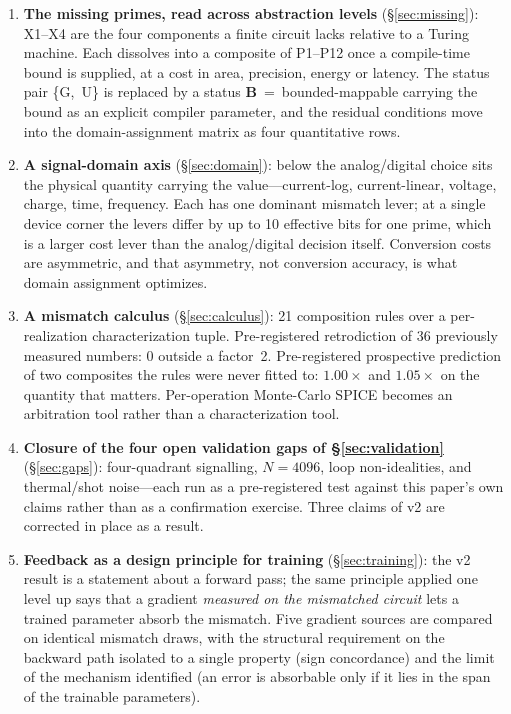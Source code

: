 \documentclass[11pt]{article}
\begin{document}
\begin{enumerate}[leftmargin=*,start=7]
\item \textbf{The missing primes, read across abstraction levels} (\S\ref{sec:missing}): X1--X4 are the four components a finite circuit lacks relative to a Turing machine. Each dissolves into a composite of P1--P12 once a compile-time bound is supplied, at a cost in area, precision, energy or latency. The status pair \{G,~U\} is replaced by a status \textbf{B}~=~bounded-mappable carrying the bound as an explicit compiler parameter, and the residual conditions move into the domain-assignment matrix as four quantitative rows.

\item \textbf{A signal-domain axis} (\S\ref{sec:domain}): below the analog/digital choice sits the physical quantity carrying the value---current-log, current-linear, voltage, charge, time, frequency. Each has one dominant mismatch lever; at a single device corner the levers differ by up to 10 effective bits for one prime, which is a larger cost lever than the analog/digital decision itself. Conversion costs are asymmetric, and that asymmetry, not conversion accuracy, is what domain assignment optimizes.

\item \textbf{A mismatch calculus} (\S\ref{sec:calculus}): 21 composition rules over a per-realization characterization tuple. Pre-registered retrodiction of 36 previously measured numbers: 0 outside a factor~2. Pre-registered prospective prediction of two composites the rules were never fitted to: $1.00\times$ and $1.05\times$ on the quantity that matters. Per-operation Monte-Carlo SPICE becomes an arbitration tool rather than a characterization tool.

\item \textbf{Closure of the four open validation gaps of \S\ref{sec:validation}} (\S\ref{sec:gaps}): four-quadrant signalling, $N=4096$, loop non-idealities, and thermal/shot noise---each run as a pre-registered test against this paper's own claims rather than as a confirmation exercise. Three claims of v2 are corrected in place as a result.

\item \textbf{Feedback as a design principle for training} (\S\ref{sec:training}): the v2 result is a statement about a forward pass; the same principle applied one level up says that a gradient \textit{measured on the mismatched circuit} lets a trained parameter absorb the mismatch. Five gradient sources are compared on identical mismatch draws, with the structural requirement on the backward path isolated to a single property (sign concordance) and the limit of the mechanism identified (an error is absorbable only if it lies in the span of the trainable parameters).
\end{enumerate}
\end{document}
